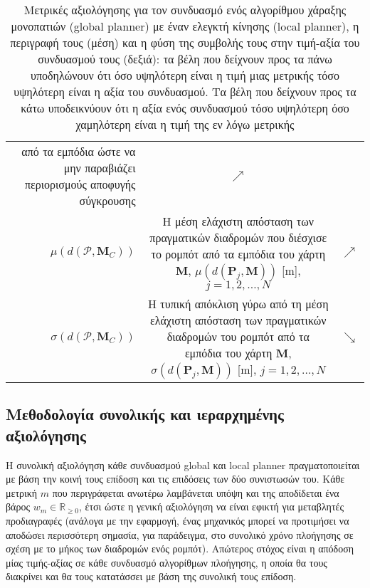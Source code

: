 \begin{table}
\begin{tabular}{rcc}
\begin{minipage}[t]{0.7\columnwidth}
      από τα εμπόδια ώστε να μην παραβιάζει περιορισμούς αποφυγής σύγκρουσης
      \end{minipage} & $\nearrow$ \\
    $\mu(d(\bm{\mathcal{P}},\bm{M}_C))$ &
    \begin{minipage}[t]{0.7\columnwidth}%
      Η μέση ελάχιστη απόσταση των πραγματικών διαδρομών που διέσχισε το
      ρομπότ από τα εμπόδια του χάρτη $\bm{M}$, $\mu(d(\bm{P}_j, \bm{M}))$ [m],
      $j = 1,2,\dots,N$
      \end{minipage} & $\nearrow$ \\
    $\sigma(d(\bm{\mathcal{P}},\bm{M}_C))$ &
    \begin{minipage}[t]{0.7\columnwidth}%
      Η τυπική απόκλιση γύρω από τη μέση ελάχιστη απόσταση των πραγματικών
      διαδρομών του ρομπότ από τα εμπόδια του χάρτη $\bm{M}$,
      $\sigma(d(\bm{P}_j, \bm{M}))$ [m], $j = 1,2,\dots,N$
      \end{minipage} & $\searrow$ \\ \bottomrule
  \end{tabular}
  \caption{\small Μετρικές αξιολόγησης για τον συνδυασμό ενός αλγορίθμου
           χάραξης μονοπατιών (global planner) με έναν ελεγκτή κίνησης
           (local planner), η περιγραφή τους (μέση) και η φύση της συμβολής
           τους στην τιμή-αξία του συνδυασμού τους (δεξιά): τα βέλη που δείχνουν
           προς τα πάνω υποδηλώνουν ότι όσο υψηλότερη είναι η τιμή μιας
           μετρικής τόσο υψηλότερη είναι η αξία του συνδυασμού. Τα βέλη που
           δείχνουν προς τα κάτω υποδεικνύουν ότι η αξία ενός συνδυασμού τόσο
           υψηλότερη όσο χαμηλότερη είναι η τιμή της εν λόγω μετρικής}
  \label{tbl:metrics_and_proportionality_combination_planners}
\end{table}



\subsection{Μεθοδολογία συνολικής και ιεραρχημένης αξιολόγησης}
\label{subsection:02_01_03:03}

Η συνολική αξιολόγηση κάθε συνδυασμού global και local planner πραγματοποιείται
με βάση την κοινή τους επίδοση και τις επιδόσεις των δύο συνιστωσών του. Κάθε
μετρική $m$ που περιγράφεται ανωτέρω λαμβάνεται υπόψη και της αποδίδεται ένα
βάρος $w_m \in \mathbb{R}_{\ge 0}$, έτσι ώστε η γενική αξιολόγηση να είναι
εφικτή για μεταβλητές προδιαγραφές (ανάλογα με την εφαρμογή, ένας μηχανικός
μπορεί να προτιμήσει να αποδώσει περισσότερη σημασία, για παράδειγμα, στο
συνολικό χρόνο πλοήγησης σε σχέση με το μήκος των διαδρομών ενός ρομπότ).
Απώτερος στόχος είναι η απόδοση μίας τιμής-αξίας σε κάθε συνδυασμό αλγορίθμων
πλοήγησης, η οποία θα τους διακρίνει και θα τους κατατάσσει με βάση της
συνολική τους επίδοση.

